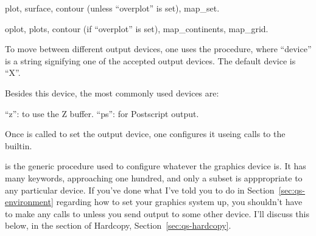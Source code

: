    plot, surface, contour
  (unless ``overplot'' is set), map\_set.

   oplot,
    plots, contour (if ``overplot'' is set),  map\_continents, map\_grid.

  To move between different output devices, one uses the
   procedure, where ``device'' is a string
  signifying one of the accepted output devices. The default device is
  ``X''.

  Besides this device, the most commonly used devices are:

  ``z'': to use the Z buffer.
  ``ps'': for Postscript output.

   
  Once  is called to set the output device, one
    configures it useing calls to the  builtin.

   is the generic procedure used to configure whatever
  the graphics device is. It has many keywords, approaching one
  hundred, and only a subset is apppropriate to any particular
  device.  If you've done what I've told you to do in
  Section~\ref{sec:qs-environment} regarding how to set your graphics
  system up, you shouldn't have to make any calls to 
  unless you send output to some other device. I'll discuss this
  below, in the section of Hardcopy, Section~\ref{sec:qs-hardcopy}.

